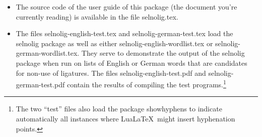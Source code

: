 \documentclass[12pt]{article}
\newcommand{\pkg}[1]{\textsf{#1}}
\newcommand{\opt}[1]{\texttt{#1}}
\newcommand{\cmmd}[1]{\texttt{\textbackslash #1}}
\begin{document}
\begin{itemize}
\begin{itemize}
\item If the \opt{english} option (or one of its synonymous options) is set, the files \pkg{selnolig-english-patterns.sty} and \pkg{selnolig-english-hyphex.sty} are loaded. The former file contains a long list of \cmmd{nolig} macros adapted to English language typographic usage,  provides a complete listing of these macros. The latter file contains a list of hyphenation exceptions, mainly for words that contain one or more potential non-ligation points and for which \TeX's hypenation algorithm either misses valid hyphenation points or selects invalid hyphenation points; see \cref{sec:addlhyph} below.

\item If the \opt{ngerman} option (or one of its synonymous options) is set, the files \pkg{selnolig-german-patterns.sty} and \pkg{selnolig-german-hyphex.sty} are loaded. The former file contains ligature-suppressing instructions appropriate for German typographic usage, \cref{sec:germ-listing} lists its contents. The latter file provides additional hyphenation rules for German-language words.

\item If the user specifies both the \opt{english} and \opt{ngerman} options (and or some of their synonymous options), \emph{both} language-specific style files will be loaded. Under normal circumstances, a user will probably want to load only one or the other set of language-specific files, but not both sets.
\end{itemize}

\item The source code of the user guide of this package (the document you're currently reading) is available in the file \pkg{selnolig.tex}. 

\item The files \pkg{selnolig-english-test.tex} and \pkg{selnolig-german-test.tex} load the \pkg{selnolig} package as well as either \pkg{selnolig-english-wordlist.tex} or \pkg{selnolig-german-wordlist.tex}. They serve to demonstrate the output of the \pkg{selnolig} package when run on lists of English or German words that are candidates for non-use of ligatures. The files \pkg{selnolig-english-test.pdf} and \pkg{selnolig-german-test.pdf} contain the results of compiling the test programs.\footnote{The two \enquote{test} files also load the package \pkg{showhyphens} to indicate automatically all instances where Lua\LaTeX\ might insert hyphenation points.}

\end{itemize}
\end{document}

